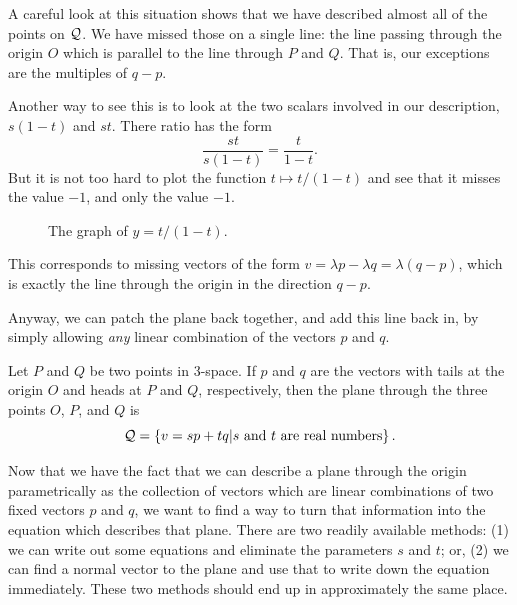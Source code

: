 \documentclass[00-livre-main.tex]{subfiles}
\begin{document}
A careful look at this situation shows that we have described almost all of the points on $\mathcal{Q}$. We have missed those on a single line: the line passing through the origin $O$ which is parallel to the line through $P$ and $Q$. That is, our exceptions are the multiples of $q-p$. 

Another way to see this is to look at the two scalars involved in our description, $s(1-t)$ and $st$. There ratio has the form
\[
\frac{st}{s(1-t)} = \frac{t}{1-t}.
\]
But it is not too hard to plot the function $t\mapsto t/(1-t)$ and see that it misses the value $-1$, and only the value $-1$. 

\clearpage
\begin{figure}[h]
\centering
{}
\caption{The graph of $y= t/(1-t)$.}
\label{fig:graph-ratio}
\end{figure}

This corresponds to missing vectors of the form $v = \lambda p - \lambda q = \lambda (q-p)$, which is exactly the line through the origin in the direction $q-p$.


Anyway, we can patch the plane back together, and add this line back in, by simply allowing \emph{any} linear combination of the vectors $p$ and $q$.

\begin{theorem}
Let $P$ and $Q$ be two points in $3$-space. If $p$ and $q$ are the vectors with tails at the origin $O$ and heads at $P$ and $Q$, respectively, then the plane through the three points $O$, $P$, and $Q$ is
\[
\mathcal{Q} = \left\{ v= s p + t q \middle| \text{$s$ and $t$ are real numbers}\right\}.
\]
\end{theorem}

Now that we have the fact that we can describe a plane through the origin parametrically as the collection of vectors which are linear combinations of two fixed vectors $p$ and $q$, we want to find a way to turn that information into the equation which describes that plane. There are two readily available methods: (1) we can write out some equations and eliminate the parameters $s$ and $t$; or, (2) we can find a normal vector to the plane and use that to write down the equation immediately. These two methods should end up in approximately the same place.
\end{document}
